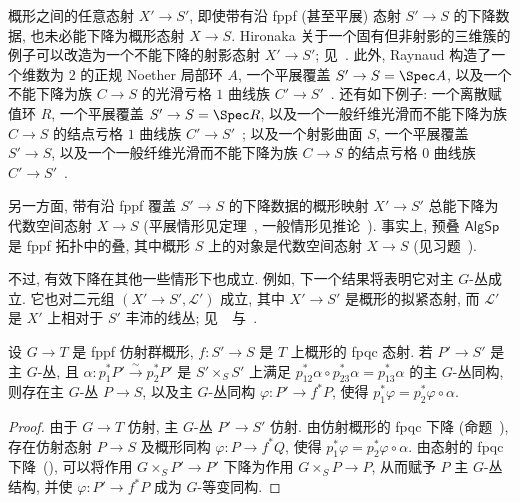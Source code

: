 \begin{example}[非有效下降]\label{src:3.1.16}
概形之间的任意态射 $X'\to S'$, 即使带有沿 fppf (甚至平展) 态射 $S'\to S$ 的下降数据, 也未必能下降为概形态射 $X\to S$. Hironaka 关于一个固有但非射影的三维簇的例子可以改造为一个不能下降的射影态射 $X'\to S'$; 见~\cite[Tag 08KE]{SP}. 此外, Raynaud 构造了一个维数为 $2$ 的正规 Noether 局部环 $A$, 一个平展覆盖 $S'\to S=\Spec A$, 以及一个不能下降为族 $C\to S$ 的光滑亏格 $1$ 曲线族 $C'\to S'$~\cite[XIII 3.2]{Ray70}. 还有如下例子: 一个离散赋值环 $R$, 一个平展覆盖 $S'\to S=\Spec R$, 以及一个一般纤维光滑而不能下降为族 $C\to S$ 的结点亏格 $1$ 曲线族 $C'\to S'$~\cite[§6.7]{BLR90}; 以及一个射影曲面 $S$, 一个平展覆盖 $S'\to S$, 以及一个一般纤维光滑而不能下降为族 $C\to S$ 的结点亏格 $0$ 曲线族 $C'\to S'$~\cite[例 $2.3$]{Ful10}.

另一方面, 带有沿 fppf 覆盖 $S'\to S$ 的下降数据的概形映射 $X'\to S'$ 总能下降为代数空间态射 $X\to S$ (平展情形见定理~, 一般情形见推论~). 事实上, 预叠 $\mathsf{AlgSp}$ 是 fppf 拓扑中的叠, 其中概形 $S$ 上的对象是代数空间态射 $X\to S$ (见习题~).

不过, 有效下降在其他一些情形下也成立. 例如, 下一个结果将表明它对主 $G$-丛成立. 它也对二元组 $(X'\to S',\mathcal L')$ 成立, 其中 $X'\to S'$ 是概形的拟紧态射, 而 $\mathcal L'$ 是 $X'$ 上相对于 $S'$ 丰沛的线丛; 见~\cite[定理 $6.7$]{BLR90}~与~\cite[定理 $4.38$]{Vis05}.
\end{example}
\begin{proposition}[主 $G$-丛的 fpqc 下降]\label{src:3.1.17}
设 $G\to T$ 是 fppf 仿射群概形, $f:S'\to S$ 是 $T$ 上概形的 fpqc 态射. 若 $P'\to S'$ 是主 $G$-丛, 且 $\alpha:p_1^*P'\xrightarrow{\sim}p_2^*P'$ 是 $S'\times_S S'$ 上满足 $p_{12}^*\alpha\circ p_{23}^*\alpha=p_{13}^*\alpha$ 的主 $G$-丛同构, 则存在主 $G$-丛 $P\to S$, 以及主 $G$-丛同构 $\varphi:P'\to f^*P$, 使得 $p_1^*\varphi=p_2^*\varphi\circ\alpha$.
\end{proposition}
\begin{proof}
由于 $G\to T$ 仿射, 主 $G$-丛 $P'\to S'$ 仿射. 由仿射概形的 fpqc 下降 (命题~), 存在仿射态射 $P\to S$ 及概形同构 $\varphi:P\to f^*Q$, 使得 $p_1^*\varphi=p_2^*\varphi\circ\alpha$. 由态射的 fpqc 下降~(), 可以将作用 $G\times_S P'\to P'$ 下降为作用 $G\times_S P\to P$, 从而赋予 $P$ 主 $G$-丛结构, 并使 $\varphi:P'\to f^*P$ 成为 $G$-等变同构.
\end{proof}
